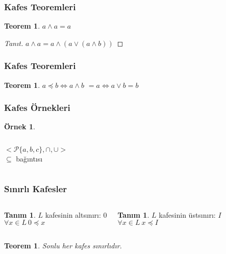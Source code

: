 \documentclass[dvipsnames]{beamer}
\theoremstyle{definition}
\newtheorem{tanim}[theorem]{Tanım}
\theoremstyle{example}
\newtheorem{ornek}[theorem]{Örnek}
\theoremstyle{plain}
\newtheorem{teorem}[theorem]{Teorem}
\begin{document}
\begin{frame}
  \frametitle{Kafes Teoremleri}

  \begin{teorem}
    $a \wedge a = a$
  \end{teorem}

  \pause
  \begin{proof}[Tanıt]
    $a \wedge a = a \wedge (a \vee (a \wedge b))$
  \end{proof}
\end{frame}

\begin{frame}
  \frametitle{Kafes Teoremleri}

  \begin{teorem}
    $a \preceq b \Leftrightarrow a \wedge b$
    $ = a \Leftrightarrow a \vee b = b$
  \end{teorem}
\end{frame}

\begin{frame}
  \frametitle{Kafes Örnekleri}

  \begin{ornek}
    \begin{columns}
      \[
	<\mathcal{P}\{a,b,c\},\cap,\cup>
      \]
      $\subseteq$ bağıntısı

      \begin{center}
      \end{center}
    \end{columns}
  \end{ornek}
\end{frame}

\begin{frame}
  \frametitle{Sınırlı Kafesler}

  \begin{columns}[t]
    \begin{tanim}
      $L$ kafesinin altsınırı: $0$\\
      $\forall x \in L~0 \preceq x$
    \end{tanim}

    \pause
    \begin{tanim}
      $L$ kafesinin üstsınırı: $I$\\
      $\forall x \in L~x \preceq I$
    \end{tanim}
  \end{columns}

  \pause
  \bigskip
  \begin{teorem}
    Sonlu her kafes sınırlıdır.
  \end{teorem}
\end{frame}
\end{document}
